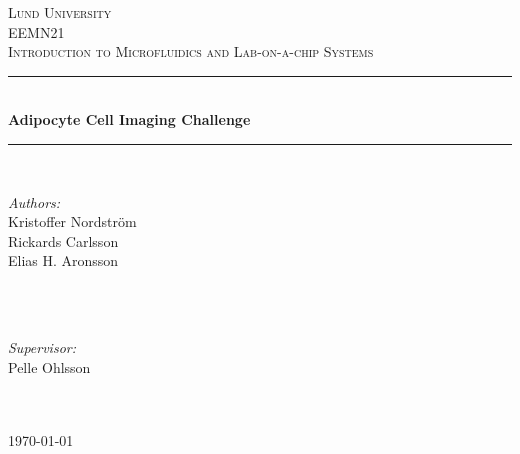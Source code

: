 \begin{titlepage}

\newcommand{\HRule}{\rule{\linewidth}{0.5mm}}
\center 
\textsc{\LARGE Lund University}\\[1.5cm]
\textsc{\Large EEMN21}\\[0.5cm]
\textsc{\large Introduction to Microfluidics and Lab-on-a-chip Systems}\\[0.5cm]
\HRule \\[0.4cm]
{ \huge \bfseries Adipocyte Cell Imaging Challenge}\\[0.4cm]
\HRule \\[2cm]

\begin{minipage}{0.4\textwidth}
\begin{flushleft}
\emph{Authors:}\\
Kristoffer Nordström \\
Rickards Carlsson \\
Elias H. Aronsson\\

\emph{}\\
\end{flushleft}
\end{minipage}
~
\begin{minipage}{0.4\textwidth}
\begin{flushright}
\emph{Supervisor:} \\
Pelle Ohlsson\\


\emph{}\\
\end{flushright}
\end{minipage}\\[2cm]

{\today}


\vfill

\end{titlepage}
